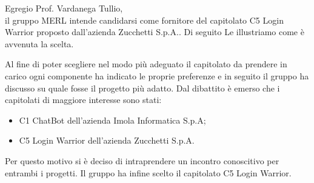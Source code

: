 Egregio Prof. Vardanega Tullio,\\
il gruppo MERL intende candidarsi come fornitore del capitolato C5 Login Warrior proposto dall’azienda Zucchetti S.p.A.. Di seguito Le illustriamo come è avvenuta la scelta.

Al fine di poter scegliere nel modo più adeguato il capitolato da prendere in carico ogni componente ha indicato le proprie preferenze e in seguito il gruppo ha discusso su quale fosse il progetto più adatto.
Dal dibattito è emerso che i capitolati di maggiore interesse sono stati:
\begin{itemize}
    \item C1 ChatBot dell’azienda Imola Informatica S.p.A;
    \item C5 Login Warrior dell’azienda Zucchetti S.p.A.
\end{itemize}
Per questo motivo si è deciso di intraprendere un incontro conoscitivo per entrambi i progetti.
Il gruppo ha infine scelto il capitolato C5 Login Warrior.
